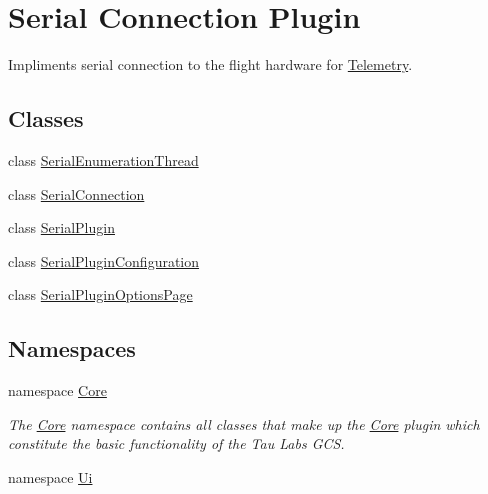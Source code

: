 \hypertarget{group___serial_plugin}{\section{\-Serial \-Connection \-Plugin}
\label{group___serial_plugin}
}


\-Impliments serial connection to the flight hardware for \hyperlink{class_telemetry}{\-Telemetry}.  


\subsection*{\-Classes}
\begin{DoxyCompactItemize}
\item 
class \hyperlink{class_serial_enumeration_thread}{\-Serial\-Enumeration\-Thread}
\item 
class \hyperlink{class_serial_connection}{\-Serial\-Connection}
\item 
class \hyperlink{class_serial_plugin}{\-Serial\-Plugin}
\item 
class \hyperlink{class_serial_plugin_configuration}{\-Serial\-Plugin\-Configuration}
\item 
class \hyperlink{class_serial_plugin_options_page}{\-Serial\-Plugin\-Options\-Page}
\end{DoxyCompactItemize}
\subsection*{\-Namespaces}
\begin{DoxyCompactItemize}
\item 
namespace \hyperlink{namespace_core}{\-Core}
\begin{DoxyCompactList}\small\item\em \-The \hyperlink{namespace_core}{\-Core} namespace contains all classes that make up the \hyperlink{namespace_core}{\-Core} plugin which constitute the basic functionality of the \-Tau \-Labs \-G\-C\-S. \end{DoxyCompactList}\item 
namespace \hyperlink{namespace_ui}{\-Ui}
\end{DoxyCompactItemize}
